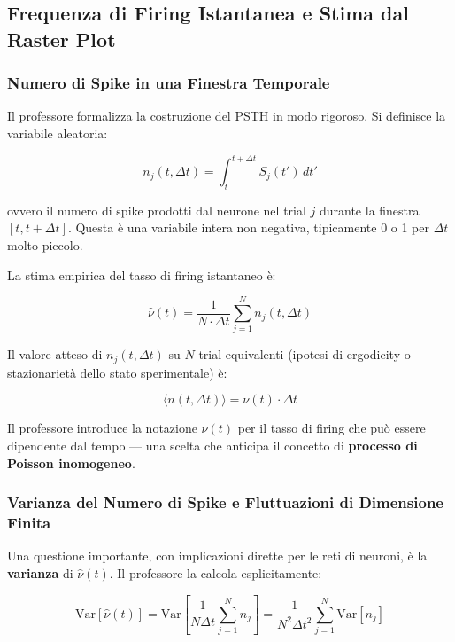 \subsection{Frequenza di Firing Istantanea e Stima dal Raster Plot}

\subsubsection{Numero di Spike in una Finestra Temporale}

Il professore formalizza la costruzione del PSTH in modo rigoroso. Si definisce la variabile aleatoria:

\begin{equation}
n_j(t, \Delta t) = \int_t^{t+\Delta t} S_j(t') \, dt'
\end{equation}

ovvero il numero di spike prodotti dal neurone nel trial $j$ durante la finestra $[t, t+\Delta t]$. Questa è una variabile intera non negativa, tipicamente 0 o 1 per $\Delta t$ molto piccolo.

La stima empirica del tasso di firing istantaneo è:

\begin{equation}
\hat{\nu}(t) = \frac{1}{N \cdot \Delta t} \sum_{j=1}^{N} n_j(t, \Delta t)
\end{equation}

Il valore atteso di $n_j(t, \Delta t)$ su $N$ trial equivalenti (ipotesi di ergodicity o stazionarietà dello stato sperimentale) è:

\begin{equation}
\langle n(t, \Delta t) \rangle = \nu(t) \cdot \Delta t
\end{equation}

Il professore introduce la notazione $\nu(t)$ per il tasso di firing che può essere dipendente dal tempo — una scelta che anticipa il concetto di \textbf{processo di Poisson inomogeneo}.

\subsubsection{Varianza del Numero di Spike e Fluttuazioni di Dimensione Finita}

Una questione importante, con implicazioni dirette per le reti di neuroni, è la \textbf{varianza} di $\hat{\nu}(t)$. Il professore la calcola esplicitamente:

\begin{equation}
\text{Var}\left[\hat{\nu}(t)\right] = \text{Var}\left[\frac{1}{N\Delta t}\sum_{j=1}^N n_j\right] = \frac{1}{N^2 \Delta t^2} \sum_{j=1}^N \text{Var}[n_j]
\end{equation}

